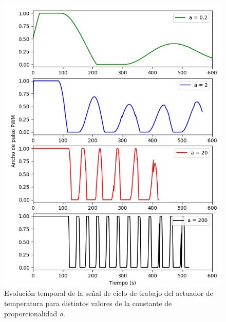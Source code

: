\documentclass[a4paper,11pt]{article}
\begin{document}
\begin{figure}[!h]
\centering
\includegraphics[width=\textwidth]{figs/lazo_duty}
\caption{Evolución temporal de la señal de ciclo de trabajo del actuador
de temperatura para distintos valores de la constante de
proporcionalidad \emph{a}.}
\label{fig:lazo_duty}
\end{figure}
\end{document}
